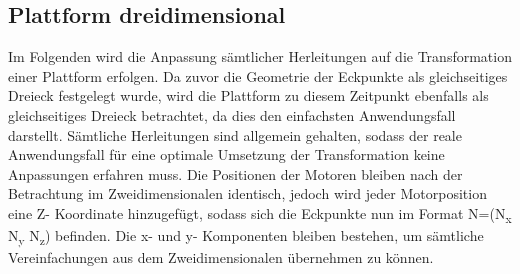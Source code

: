 \documentclass[a4paper, 12pt]{article}
\begin{document}
		\subsection{Plattform dreidimensional}
			Im Folgenden wird die Anpassung sämtlicher Herleitungen auf die Transformation einer Plattform erfolgen. Da zuvor die Geometrie der Eckpunkte als gleichseitiges Dreieck festgelegt wurde, wird die Plattform zu diesem Zeitpunkt ebenfalls als gleichseitiges Dreieck betrachtet, da dies den einfachsten Anwendungsfall darstellt. Sämtliche Herleitungen sind allgemein gehalten, sodass der reale Anwendungsfall für eine optimale Umsetzung der Transformation keine Anpassungen erfahren muss.	
			Die Positionen der Motoren bleiben nach der Betrachtung im Zweidimensionalen identisch, jedoch wird jeder Motorposition eine Z- Koordinate hinzugefügt, sodass sich die Eckpunkte nun im Format N=(N\textsubscript{x} N\textsubscript{y} N\textsubscript{z}) befinden. Die x- und y- Komponenten bleiben bestehen, um sämtliche Vereinfachungen aus dem Zweidimensionalen übernehmen zu können.
\end{document}
